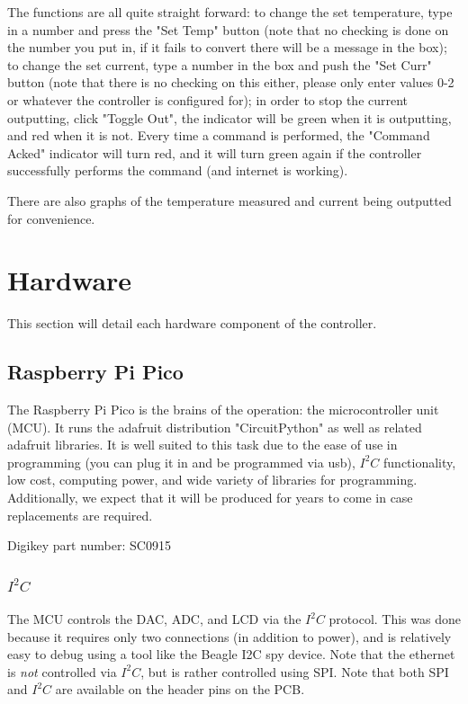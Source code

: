 \documentclass[11pt, letterpaper]{article}
\begin{document}
The functions are all quite straight forward: to change the set temperature, type in a number and press the "Set Temp" button (note that no checking is done on the number you put in, if it fails to convert there will be a message in the box); to change the set current, type a number in the box and push the "Set Curr" button (note that there is no checking on this either, please only enter values 0-2 or whatever the controller is configured for); in order to stop the current outputting, click "Toggle Out", the indicator will be green when it is outputting, and red when it is not. Every time a command is performed, the "Command Acked" indicator will turn red, and it will turn green again if the controller successfully performs the command (and internet is working).

There are also graphs of the temperature measured and current being outputted for convenience.

\section{Hardware}

This section will detail each hardware component of the controller.

\subsection{Raspberry Pi Pico}

The Raspberry Pi Pico is the brains of the operation: the microcontroller unit (MCU). It runs the adafruit distribution "CircuitPython" as well as related adafruit libraries. It is well suited to this task due to the ease of use in programming (you can plug it in and be programmed via usb), $I^{2}C$ functionality, low cost, computing power, and wide variety of libraries for programming. Additionally, we expect that it will be produced for years to come in case replacements are required.

Digikey part number: SC0915

\subsubsection{$I^2 C$}

The MCU controls the DAC, ADC, and LCD via the $I^2 C$ protocol. This was done because it requires only two connections (in addition to power), and is relatively easy to debug using a tool like the Beagle I2C spy device. Note that the ethernet is {\it not} controlled via $I^2 C$, but is rather controlled using SPI. Note that both SPI and $I^2 C$ are available on the header pins on the PCB.
\end{document}
